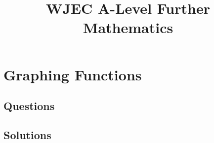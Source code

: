 \documentclass[answers]{exam}
\title{WJEC A-Level Further Mathematics}
\begin{document}
\section{Graphing Functions}

\subsection{Questions}


\clearpage

\subsection{Solutions}

\end{document}
